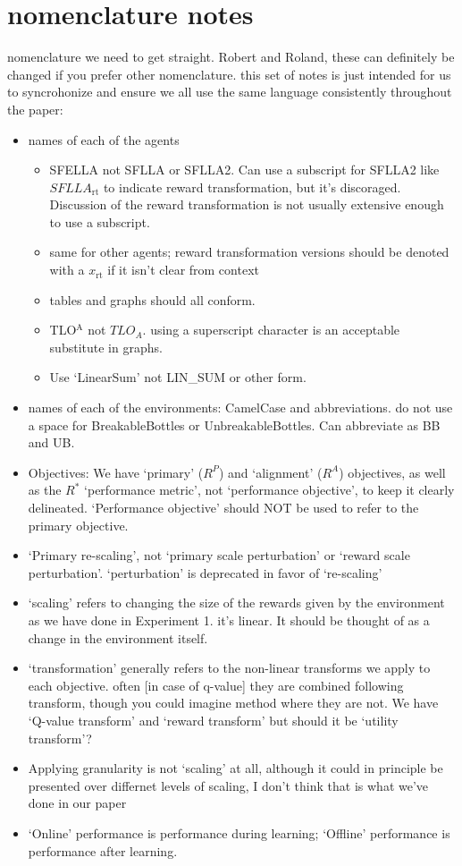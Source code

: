 \section*{nomenclature notes}
nomenclature we need to get straight. Robert and Roland, these can definitely be changed if you prefer other nomenclature. this set of notes is just intended for us to syncrohonize and ensure we all use the same language consistently throughout the paper:

\begin{itemize}
    \item names of each of the agents
        \begin{itemize}
            \item SFELLA not SFLLA or SFLLA2. Can use a subscript for SFLLA2 like $SFLLA_{\text{rt}}$ to indicate reward transformation, but it's discoraged. Discussion of the reward transformation is not usually extensive enough to use a subscript. 
            \item same for other agents; reward transformation versions should be denoted with a $x_{\text{rt}}$ if it isn't clear from context
            \item tables and graphs should all conform.
            \item TLO$^\text{A}$ not $TLO_A$. using a superscript character is an acceptable substitute in graphs.
            \item Use `LinearSum' not LIN\_SUM or other form.
        \end{itemize}
    \item names of each of the environments: CamelCase and abbreviations. do not use a space for BreakableBottles or UnbreakableBottles. Can abbreviate as BB and UB. 
    \item Objectives: We have `primary' ($R^P$) and `alignment' ($R^A$) objectives, as well as the $R^*$ `performance metric', not `performance objective', to keep it clearly delineated. `Performance objective' should NOT be used to refer to the primary objective.
    \item `Primary re-scaling', not `primary scale perturbation' or `reward scale perturbation'. `perturbation' is deprecated in favor of `re-scaling'
    \item `scaling' refers to changing the size of the rewards given by the environment as we have done in Experiment 1. it's linear. It should be thought of as a change in the environment itself.
    \item `transformation' generally refers to the non-linear transforms we apply to each objective. often [in case of q-value] they are combined following transform, though you could imagine method where they are not. We have `Q-value transform' and `reward transform' but should it be `utility transform'?
    \item Applying granularity is not `scaling' at all, although it could in principle be presented over differnet levels of scaling, I don't think that is what we've done in our paper
    \item `Online' performance is performance during learning; `Offline' performance is performance after learning.
\end{itemize}

